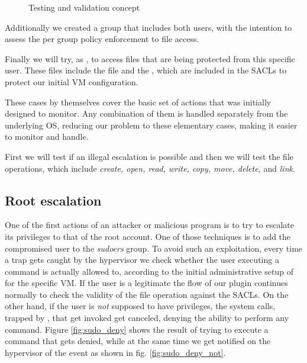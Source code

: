 \begin{figure}[ht]
	\centering
	
	\caption{Testing and validation concept}
	\label{fig:attack}
\end{figure}


\par Additionally we created a group that includes both users, with the intention to assess the per group policy enforcement to file access. 

\par Finally we will try, as , to access files that are being protected from this specific user. These files include the  file and the , which are included in the \acp{SACL} to protect our initial \ac{VM} configuration.

\par These cases by themselves cover the basic set of actions that  was initially designed to monitor. Any combination of them is handled separately from the underlying \ac{OS}, reducing our problem to these elementary cases, making it easier to monitor and handle.

\par First we will test if an illegal  escalation is possible and then we will test the file operations, which include \emph{create, open, read, write, copy, move, delete,} and \emph{link}.

\subsection{Root escalation}

\par One of the first actions of an attacker or malicious program is to try to escalate its privileges to that of the root account. One of those techniques is to add the compromised user to the \emph{sudoers} group. To avoid such an exploitation, every time a trap gets caught by the hypervisor we check whether the user executing a  command is actually allowed to, according to the initial administrative setup of  for the specific \ac{VM}. If the user is a legitimate  the flow of our plugin continues normally to check the validity of the file operation against the \acp{SACL}. On the other hand, if the user is \emph{not} supposed to have  privileges, the system calls, trapped by , that get invoked get canceled, denying the ability to perform any  command. Figure \ref{fig:sudo_deny} shows the result of trying to execute a  command that gets denied, while at the same time we get notified on the hypervisor of the event as shown in fig. \ref{fig:sudo_deny_not}.

